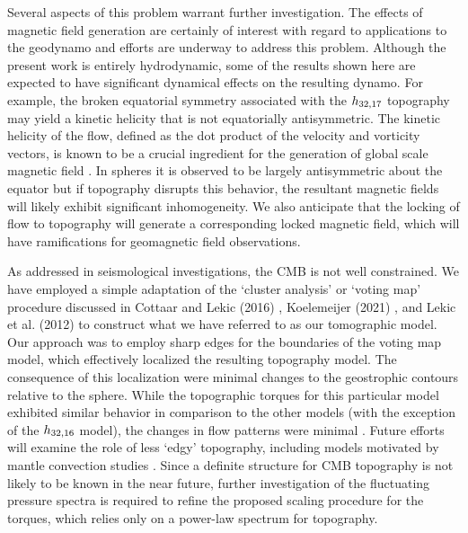 Several aspects of this problem warrant further investigation. The effects of magnetic field generation are certainly of interest with regard to applications to the geodynamo and efforts are underway to address this problem. Although the present work is entirely hydrodynamic, some of the results shown here are expected to have significant dynamical effects on the resulting dynamo. 
For example, the broken equatorial symmetry associated with the $h_{32,17}$ topography may yield a kinetic helicity that is not equatorially antisymmetric. 
The kinetic helicity of the flow, defined as the dot product of the velocity and vorticity vectors, is known to be a crucial ingredient for the generation of global scale magnetic field \citep{eP55}. In spheres it is observed to be largely antisymmetric about the equator but if topography disrupts this behavior, the resultant magnetic fields will likely exhibit significant inhomogeneity.
 We also anticipate that the locking of flow to topography will generate a corresponding locked magnetic field, which will have ramifications for geomagnetic field observations.

 As addressed in seismological investigations, the  CMB is not well constrained. We have employed a simple adaptation of the `cluster analysis' or `voting map' procedure discussed in Cottaar and Lekic (2016) \citep{sC16}, Koelemeijer (2021) \citep{pK21}, and Lekic et al. (2012) \citep{vL12} to construct what we have referred to as our tomographic model. 
 Our approach was to employ sharp edges for the boundaries of the voting map model, which effectively localized the resulting topography model. 
 The consequence of this localization were minimal changes to the geostrophic contours relative to the sphere. 
 While the topographic torques for this particular model exhibited similar behavior in comparison to the other models (with the exception of the $h_{32,16}$ model), the changes in flow patterns were minimal . 
 Future efforts will examine the role of less `edgy' topography, including models motivated by mantle convection studies \citep[e.g.][]{tL07,tL10}.
  Since a definite structure for CMB topography is not likely to be known in the near future, further investigation of the fluctuating pressure spectra is required to refine the proposed scaling procedure for the torques, which relies only on a power-law spectrum for topography.


